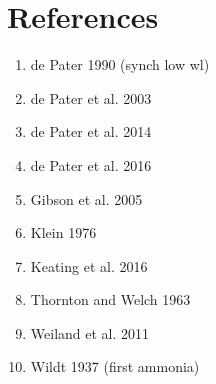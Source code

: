 \documentclass{article}
\begin{document}
\section{References}
\begin{enumerate}
	\item de Pater 1990 (synch low wl)
	\item de Pater et al. 2003
	\item de Pater et al. 2014
	\item de Pater et al. 2016
	\item Gibson et al. 2005
	\item Klein 1976
	\item Keating et al. 2016
	\item Thornton and Welch 1963
	\item Weiland et al. 2011
	\item Wildt 1937 (first ammonia)
\end{enumerate}



\end{document}
